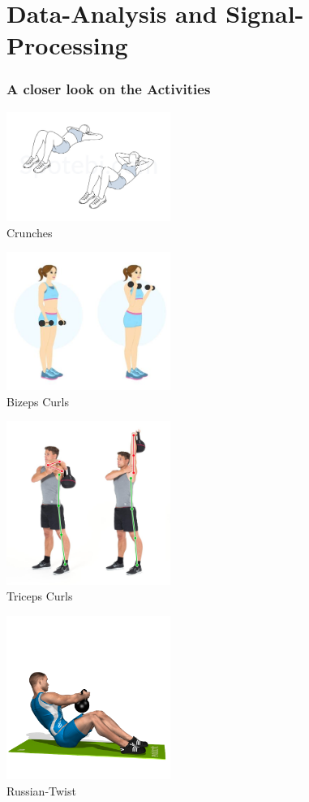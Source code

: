 \documentclass[aspectratio=169]{beamer}
\begin{document}
\section{Data-Analysis and Signal-Processing}
\begin{frame}
	\frametitle{A closer look on the Activities}
	\begin{minipage}{0.49\textwidth}
		\centering
		\includegraphics[width=0.4\textwidth]{crunches.jpeg}\\
		Crunches
	\end{minipage}\hfill
	\begin{minipage}{0.49\textwidth}
		\centering
		\includegraphics[width=0.4\textwidth]{curls.jpeg}\\
		Bizeps Curls
	\end{minipage}
	\begin{minipage}{0.49\textwidth}
		\centering
		\includegraphics[width=0.4\textwidth]{triceps.jpeg}\\
		Triceps Curls
	\end{minipage} \hfill
	\begin{minipage}{0.49\textwidth}
		\centering
		\includegraphics[width=0.4\textwidth]{russian_twist.png}\\
		Russian-Twist
	\end{minipage}
\end{frame}
\end{document}
